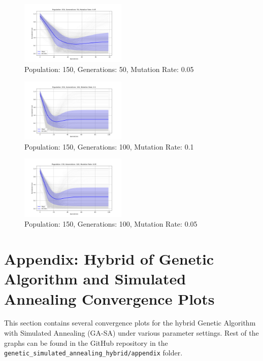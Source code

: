 \documentclass{article}
\begin{document}
    \begin{figure}[H]
        \centering
        \includegraphics[width=0.45\textwidth]{genetic_algorithm/appendix/Population_150_Generations_50_MutationRate_0.05}
        \caption{Population: 150, Generations: 50, Mutation Rate: 0.05}
        \label{fig:app_ga_150_50_05}
    \end{figure}

    \begin{figure}[H]
        \centering
        \includegraphics[width=0.45\textwidth]{genetic_algorithm/appendix/Population_150_Generations_100_MutationRate_0.1}
        \caption{Population: 150, Generations: 100, Mutation Rate: 0.1}
        \label{fig:app_ga_150_100_1}
    \end{figure}

    \begin{figure}[H]
        \centering
        \includegraphics[width=0.45\textwidth]{genetic_algorithm/appendix/Population_150_Generations_100_MutationRate_0.05}
        \caption{Population: 150, Generations: 100, Mutation Rate: 0.05}
        \label{fig:app_ga_150_100_05}
    \end{figure}

    \newpage


    \section{Appendix: Hybrid of Genetic Algorithm and Simulated Annealing Convergence Plots}
    This section contains several convergence plots for the hybrid Genetic Algorithm with Simulated Annealing (GA-SA) under various parameter settings. Rest of the graphs can be found in the GitHub repository in the \texttt{genetic\_simulated\_annealing\_hybrid/appendix} folder.
\end{document}
